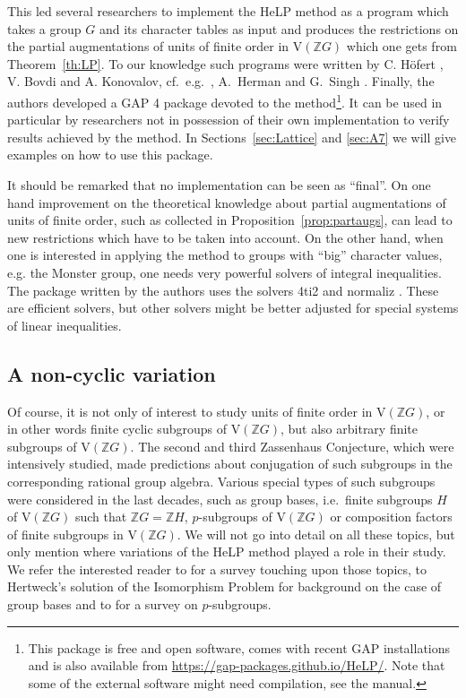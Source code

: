 \documentclass[10pt,a4paper,reqno]{amsart}
\theoremstyle{definition}
\theoremstyle{remark}
\newcommand{\V}{\mathrm{V}}
\newcommand{\ZZ}{\mathbb{Z}}
\begin{document}
This led several researchers to implement the HeLP method as a program which takes a group $G$ and its character tables as input and produces the restrictions on the partial augmentations of units of finite order in $\V(\ZZ G)$ which one gets from Theorem~\ref{th:LP}. To our knowledge such programs were written by C. H\"ofert \cite{BHK04}, V. Bovdi and A. Konovalov, cf.\ e.g.\ \cite{BKL08}, A.~Herman and G.~Singh \cite{HS15}.  Finally, the authors \cite{HeLPPaper} developed a \textsf{GAP 4} package \cite{GAP} devoted to the method\footnote{This package is free and open software, comes with recent \textsf{GAP} installations and is also available from \url{https://gap-packages.github.io/HeLP/}.  Note that some of the external software might need compilation, see the manual.}. It can be used in particular by researchers not in possession of their own implementation to verify results achieved by the method. In Sections~\ref{sec:Lattice} and \ref{sec:A7} we will give examples on how to use this package.

It should be remarked that no implementation can be seen as ``final''. On one hand improvement on the theoretical knowledge about partial augmentations of units of finite order, such as collected in Proposition~\ref{prop:partaugs}, can lead to new restrictions which have to be taken into account. On the other hand, when one is interested in applying the method to groups with ``big'' character values, e.g. the Monster group, one needs very powerful solvers of integral inequalities. The package written by the authors uses the solvers \textsf{4ti2} \cite{4ti2} and \textsf{normaliz} \cite{Normaliz}. These are efficient solvers, but other solvers might be better adjusted for special systems of linear inequalities.

\subsection{A non-cyclic variation}
Of course, it is not only of interest to study units of finite order in $\V(\ZZ G)$, or in other words finite cyclic subgroups of $\V(\ZZ G)$, but also arbitrary finite subgroups of $\V(\ZZ G)$. The second and third Zassenhaus Conjecture, which were intensively studied, made predictions about conjugation of such subgroups in the corresponding rational group algebra. Various special types of such subgroups were considered in the last decades, such as group bases, i.e.\ finite subgroups $H$ of $\V(\ZZ G)$ such that $\ZZ G = \ZZ H$, $p$-subgroups of $\V(\ZZ G)$ or composition factors of finite subgroups in $\V(\ZZ G)$. We will not go into detail on all these topics, but only mention where variations of the HeLP method played a role in their study. We refer the interested reader to \cite{MdRSurvey} for a survey touching upon those topics, to Hertweck's solution of the Isomorphism Problem for background on the case of group bases \cite{Her01} and to \cite{KM17} for a survey on $p$-subgroups. 
\end{document}

